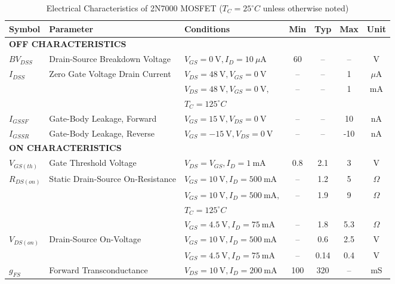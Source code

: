 \documentclass[12pt, a4paper]{article}
\numberwithin{table}{section}
\numberwithin{figure}{section}
\begin{document}
\begin{table}[h!]
    \caption{Electrical Characteristics of 2N7000 MOSFET ($T_C = 25^\circ C$ unless otherwise noted)}
    \label{tab:2N7000}
    \small
    {\centering
    \begin{tabularx}{\textwidth}{l X l c c c c}
        \toprule
        \textbf{Symbol} & \textbf{Parameter} & \textbf{Conditions} & \textbf{Min} & \textbf{Typ} & \textbf{Max} & \textbf{Unit} \\ 
        \midrule
        \multicolumn{7}{l}{\textbf{OFF CHARACTERISTICS}} \\
        $BV_{DSS}$ & Drain-Source Breakdown Voltage & $V_{GS} = 0~\text{V}, I_D = 10~\mu\text{A}$ & 60 & -- & -- & V \\
        $I_{DSS}$ & Zero Gate Voltage Drain Current & $V_{DS} = 48~\text{V}, V_{GS} = 0~\text{V}$ & -- & -- & 1 & $\mu$A \\
                  & & $V_{DS} = 48~\text{V}, V_{GS} = 0~\text{V},$ & -- & -- & 1 & mA \\
                   && $T_C = 125^\circ C$&&&& \\
        $I_{GSSF}$ & Gate-Body Leakage, Forward & $V_{GS} = 15~\text{V}, V_{DS} = 0~\text{V}$ & -- & -- & 10 & nA \\
        $I_{GSSR}$ & Gate-Body Leakage, Reverse & $V_{GS} = -15~\text{V}, V_{DS} = 0~\text{V}$ & -- & -- & -10 & nA \\
        \midrule
        \multicolumn{7}{l}{\textbf{ON CHARACTERISTICS}} \\
        $V_{GS(th)}$ & Gate Threshold Voltage & $V_{DS} = V_{GS}, I_D = 1~\text{mA}$ & 0.8 & 2.1 & 3 & V \\
        $R_{DS(on)}$ & Static Drain-Source On-Resistance & $V_{GS} = 10~\text{V}, I_D = 500~\text{mA}$ & -- & 1.2 & 5 & $\Omega$ \\
                   & & $V_{GS} = 10~\text{V}, I_D = 500~\text{mA},$ & -- & 1.9 & 9 & $\Omega$ \\
                   && $T_C = 125^\circ C$&&&& \\
                   & & $V_{GS} = 4.5~\text{V}, I_D = 75~\text{mA}$ & -- & 1.8 & 5.3 & $\Omega$ \\
        $V_{DS(on)}$ & Drain-Source On-Voltage & $V_{GS} = 10~\text{V}, I_D = 500~\text{mA}$ & -- & 0.6 & 2.5 & V \\
                   & & $V_{GS} = 4.5~\text{V}, I_D = 75~\text{mA}$ & -- & 0.14 & 0.4 & V \\
        $g_{FS}$ & Forward Transconductance & $V_{DS} = 10~\text{V}, I_D = 200~\text{mA}$ & 100 & 320 & -- & mS \\

\end{tabularx}}
\end{table}
\end{document}
